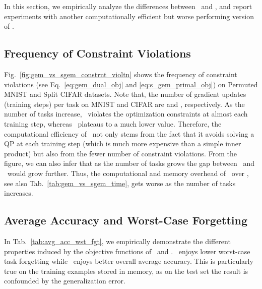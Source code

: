 In this section, we empirically analyze the differences between \sgem\ and \gem, and report experiments with 
another computationally efficient but worse performing version of \gem.
\subsection{Frequency of Constraint Violations}
\label{sec:supp_freq_const_violtn}
Fig.~\ref{fig:gem_vs_sgem_constrnt_violtn} shows the frequency of constraint violations (see Eq.~\ref{eq:gem_dual_obj} and \ref{eq:s_gem_primal_obj}) 
on Permuted MNIST and Split CIFAR datasets. 
Note that, the number of gradient updates (training steps) per task on MNIST and CIFAR are  and , respectively. 
As the number of tasks increase, \gem\ violates the optimization constraints at almost each training step, whereas \sgem\ plateaus to a much lower value. 
Therefore, the computational efficiency of \sgem\ not only stems from the fact that it avoids solving a QP at each training step (which is much more expensive than a simple
inner product) but also from the fewer number of constraint violations. From the figure, we can also infer that as the number of tasks grows the gap between \gem\ 
and \sgem\ would grow further. Thus, the computational and memory overhead of \gem\ over \sgem, see also Tab.~\ref{tab:gem_vs_sgem_time}, 
gets worse as the number of tasks increases.


\subsection{Average Accuracy and Worst-Case Forgetting}
\label{sec:avg_Acc_wst_fgt}

In Tab.~\ref{tab:avg_acc_wst_fgt}, 
we empirically demonstrate the different properties induced by the objective functions of \gem\ and \sgem. \gem\ enjoys lower worst-case task forgetting
while \sgem\ enjoys better overall average accuracy. This is particularly true on the training examples stored in memory, as on the test set the result is confounded
by the generalization error.



